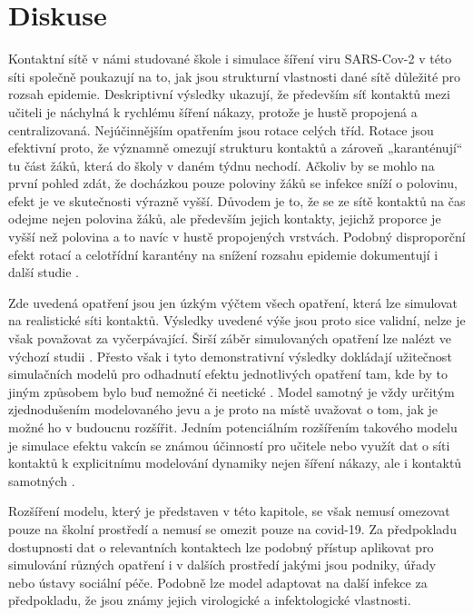 \section*{Diskuse} 
Kontaktní sítě v námi studované škole i simulace šíření viru SARS-Cov-2 v této síti společně poukazují na to, jak jsou strukturní vlastnosti dané sítě důležité pro rozsah epidemie. Deskriptivní výsledky ukazují, že především síť kontaktů mezi učiteli je náchylná k rychlému šíření nákazy, protože je hustě propojená a centralizovaná. Nejúčinnějším opatřením jsou rotace celých tříd. Rotace jsou efektivní proto, že významně omezují strukturu kontaktů a zároveň „karanténují“ tu část žáků, která do školy v daném týdnu nechodí. Ačkoliv by se mohlo na první pohled zdát, že docházkou pouze poloviny žáků se infekce sníží o polovinu, efekt je ve skutečnosti výrazně vyšší. Důvodem je to, že se ze sítě kontaktů na čas odejme nejen polovina žáků, ale především jejich kontakty, jejichž proporce je vyšší než polovina a to navíc v hustě propojených vrstvách. Podobný disproporční efekt rotací a celotřídní karantény na snížení rozsahu epidemie dokumentují i další studie \cite{gemmetto2014mitigation, mcgee2021model}. 

Zde uvedená opatření jsou jen úzkým výčtem všech opatření, která lze simulovat na realistické síti kontaktů. Výsledky uvedené výše jsou proto sice validní, nelze je však považovat za vyčerpávající. Širší záběr simulovaných opatření lze nalézt ve výchozí studii \cite{Brom2021.06.28.21259628}. Přesto však i tyto demonstrativní výsledky dokládají užitečnost simulačních modelů pro odhadnutí efektu jednotlivých opatření tam, kde by to jiným způsobem bylo buď nemožné či neetické \cite{squazzoni2020computational}. Model samotný je vždy určitým zjednodušením modelovaného jevu a je proto na místě uvažovat o tom, jak je možné ho v budoucnu rozšířit. Jedním potenciálním rozšířením takového modelu je simulace efektu vakcín se známou účinností pro učitele \cite{mcgee2021model} nebo využít dat o síti kontaktů k explicitnímu modelování dynamiky nejen šíření nákazy, ale i kontaktů samotných \cite{Rao_etal2021}.

Rozšíření modelu, který je představen v této kapitole, se však nemusí omezovat pouze na školní prostředí a nemusí se omezit pouze na covid-19. Za předpokladu dostupnosti dat o relevantních kontaktech lze podobný přístup aplikovat pro simulování různých opatření i v dalších prostředí jakými jsou podniky, úřady nebo ústavy sociální péče. Podobně lze model adaptovat na další infekce za předpokladu, že jsou známy jejich virologické a infektologické vlastnosti. 

